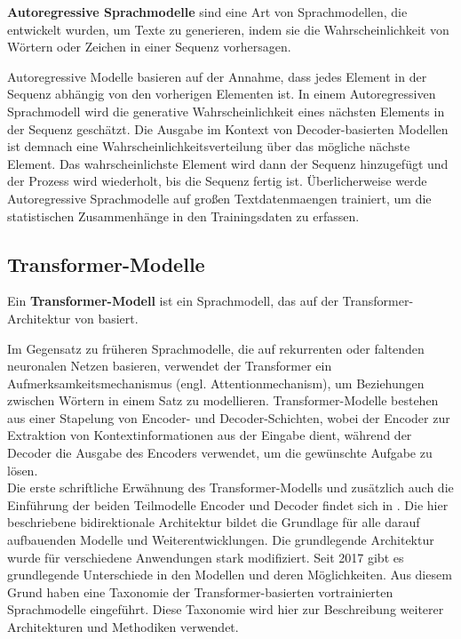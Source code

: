 \begin{definition}\label{def:autoregressive-sprachmodelle}
    \textbf{Autoregressive Sprachmodelle} sind eine Art von Sprachmodellen, die entwickelt wurden, um Texte zu generieren,
    indem sie die Wahrscheinlichkeit von Wörtern oder Zeichen in einer Sequenz vorhersagen.
\end{definition}

Autoregressive Modelle basieren auf der Annahme, dass jedes Element in der Sequenz abhängig von den vorherigen Elementen ist.
In einem Autoregressiven Sprachmodell wird die generative Wahrscheinlichkeit eines nächsten Elements in der Sequenz geschätzt.
Die Ausgabe im Kontext von Decoder-basierten Modellen ist demnach eine Wahrscheinlichkeitsverteilung über das mögliche nächste Element.
Das wahrscheinlichste Element wird dann der Sequenz hinzugefügt und der Prozess wird wiederholt, bis die Sequenz fertig ist.
Überlicherweise werde Autoregressive Sprachmodelle auf großen Textdatenmaengen trainiert, um die statistischen Zusammenhänge in den Trainingsdaten zu erfassen.

\subsection{Transformer-Modelle}\label{sec:grundlagen:transformer}
\begin{definition}\label{def:transformer-modell}
    Ein \textbf{Transformer-Modell} ist ein Sprachmodell, das auf der Transformer-Architektur von \citet{attention} basiert.
\end{definition}
Im Gegensatz zu früheren Sprachmodelle, die auf rekurrenten oder faltenden neuronalen Netzen basieren, verwendet der Transformer ein Aufmerksamkeitsmechanismus (engl. Attentionmechanism), um Beziehungen zwischen Wörtern in einem Satz zu modellieren.
Transformer-Modelle bestehen aus einer Stapelung von Encoder- und Decoder-Schichten, wobei der Encoder zur Extraktion von Kontextinformationen aus der Eingabe dient,
während der Decoder die Ausgabe des Encoders verwendet, um die gewünschte Aufgabe zu lösen.\\

Die erste schriftliche Erwähnung des Transformer-Modells und zusätzlich auch die Einführung der beiden Teilmodelle Encoder und Decoder findet sich in \citet{attention}.
Die hier beschriebene bidirektionale Architektur bildet die Grundlage für alle darauf aufbauenden Modelle und Weiterentwicklungen.
Die grundlegende Architektur wurde für verschiedene Anwendungen stark modifiziert.
Seit 2017 gibt es grundlegende Unterschiede in den Modellen und deren Möglichkeiten.
Aus diesem Grund haben \citet{ammus} eine Taxonomie der Transformer-basierten vortrainierten Sprachmodelle eingeführt.
Diese Taxonomie wird hier zur Beschreibung weiterer Architekturen und Methodiken verwendet.\\

